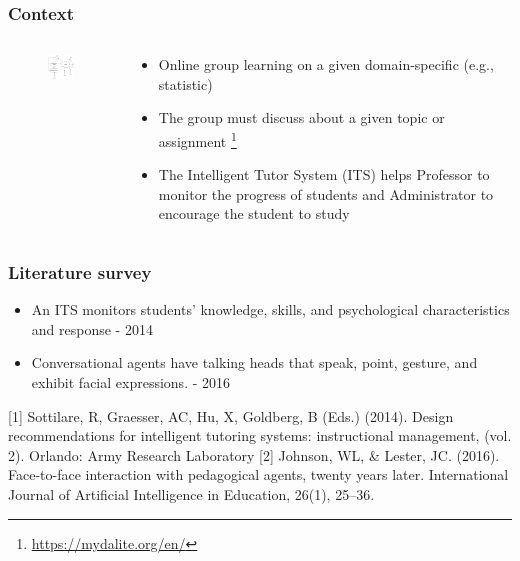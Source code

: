 \documentclass{beamer}
\begin{document}
\begin{frame}
\frametitle{Context}
\begin{columns}
		\begin{column}{.5\textwidth}
		\begin{figure}
			\includegraphics[width=45mm]{se1.png}
		\end{figure}
		
	\end{column}
	\begin{column}{.5\textwidth}
		\begin{itemize}
			\item Online group learning on a given domain-specific (e.g., statistic)
			\item The group must discuss about a given topic or assignment \footnote{\url{https://mydalite.org/en/}}
			\item The Intelligent Tutor System (ITS) helps Professor to monitor the progress of students and Administrator to encourage the student to study
		\end{itemize}
	\end{column}

\end{columns}

\end{frame}
\begin{frame}
\frametitle{Literature survey}
\begin{itemize}
\item An ITS monitors  students' knowledge, skills, and psychological
characteristics  and response \cite{Sottilare} - 2014
\item Conversational agents have talking heads that
speak, point, gesture, and exhibit facial expressions.
\cite{Johnson2016} - 2016
\end{itemize}
\begin{thebibliography}{01}
	{\tiny 	{}	[1] Sottilare, R, Graesser, AC, Hu, X, Goldberg, B (Eds.) (2014). Design recommendations
		for intelligent tutoring systems: instructional management, (vol. 2). Orlando:
		Army Research Laboratory
		 	Johnson, WL, \& Lester, JC. (2016). Face-to-face interaction with pedagogical
		agents, twenty years later. International Journal of Artificial Intelligence in
		Education, 26(1), 25–36. }
\end{thebibliography}

\end{frame}
\end{document}
